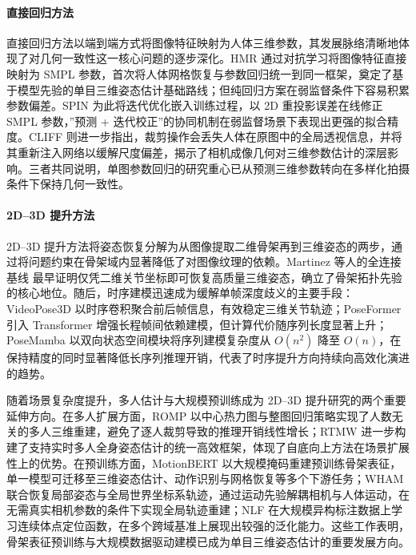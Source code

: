 \paragraph{直接回归方法}

直接回归方法以端到端方式将图像特征映射为人体三维参数，其发展脉络清晰地体现了对几何一致性这一核心问题的逐步深化。HMR 通过对抗学习将图像特征直接映射为 SMPL 参数，首次将人体网格恢复与参数回归统一到同一框架，奠定了基于模型先验的单目三维姿态估计基础路线；但纯回归方案在弱监督条件下容易积累参数偏差。SPIN 为此将迭代优化嵌入训练过程，以 2D 重投影误差在线修正 SMPL 参数，”预测 + 迭代校正”的协同机制在弱监督场景下表现出更强的拟合精度。CLIFF 则进一步指出，裁剪操作会丢失人体在原图中的全局透视信息，并将其重新注入网络以缓解尺度偏差，揭示了相机成像几何对三维参数估计的深层影响。三者共同说明，单图参数回归的研究重心已从预测三维参数转向在多样化拍摄条件下保持几何一致性。

\paragraph{2D--3D 提升方法}

2D--3D 提升方法将姿态恢复分解为从图像提取二维骨架再到三维姿态的两步，通过将问题约束在骨架域内显著降低了对图像纹理的依赖。Martinez 等人的全连接基线 最早证明仅凭二维关节坐标即可恢复高质量三维姿态，确立了骨架拓扑先验的核心地位。随后，时序建模迅速成为缓解单帧深度歧义的主要手段：VideoPose3D 以时序卷积聚合前后帧信息，有效稳定三维关节轨迹；PoseFormer 引入 Transformer 增强长程帧间依赖建模，但计算代价随序列长度显著上升；PoseMamba 以双向状态空间模块将序列建模复杂度从 $O(n^2)$ 降至 $O(n)$，在保持精度的同时显著降低长序列推理开销，代表了时序提升方向持续向高效化演进的趋势。

随着场景复杂度提升，多人估计与大规模预训练成为 2D--3D 提升研究的两个重要延伸方向。在多人扩展方面，ROMP 以中心热力图与整图回归策略实现了人数无关的多人三维重建，避免了逐人裁剪导致的推理开销线性增长；RTMW 进一步构建了支持实时多人全身姿态估计的统一高效框架，体现了自底向上方法在场景扩展性上的优势。在预训练方面，MotionBERT 以大规模掩码重建预训练骨架表征，单一模型可迁移至三维姿态估计、动作识别与网格恢复等多个下游任务；WHAM 联合恢复局部姿态与全局世界坐标系轨迹，通过运动先验解耦相机与人体运动，在无需真实相机参数的条件下实现全局轨迹重建；NLF 在大规模异构标注数据上学习连续体点定位函数，在多个跨域基准上展现出较强的泛化能力。这些工作表明，骨架表征预训练与大规模数据驱动建模已成为单目三维姿态估计的重要发展方向。

